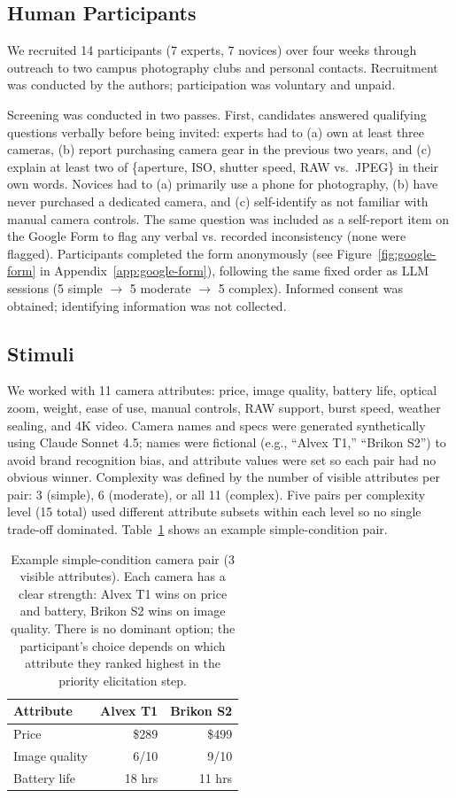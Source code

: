 \documentclass[manuscript,review]{acmart}
\begin{document}
\subsection{Human Participants}
We recruited 14 participants (7 experts, 7 novices) over four weeks through outreach to two campus photography clubs and personal contacts. Recruitment was conducted by the authors; participation was voluntary and unpaid.

Screening was conducted in two passes. First, candidates answered qualifying questions verbally before being invited: experts had to (a) own at least three cameras, (b) report purchasing camera gear in the previous two years, and (c) explain at least two of \{aperture, ISO, shutter speed, RAW vs.\ JPEG\} in their own words. Novices had to (a) primarily use a phone for photography, (b) have never purchased a dedicated camera, and (c) self-identify as not familiar with manual camera controls. The same question was included as a self-report item on the Google Form to flag any verbal vs. recorded inconsistency (none were flagged). Participants completed the form anonymously (see Figure~\ref{fig:google-form} in Appendix~\ref{app:google-form}), following the same fixed order as LLM sessions (5 simple $\rightarrow$ 5 moderate $\rightarrow$ 5 complex). Informed consent was obtained; identifying information was not collected.

\subsection{Stimuli}
We worked with 11 camera attributes: price, image quality, battery life, optical zoom, weight, ease of use, manual controls, RAW support, burst speed, weather sealing, and 4K video. Camera names and specs were generated synthetically using Claude Sonnet 4.5; names were fictional (e.g., ``Alvex T1,'' ``Brikon S2'') to avoid brand recognition bias, and attribute values were set so each pair had no obvious winner. Complexity was defined by the number of visible attributes per pair: 3 (simple), 6 (moderate), or all 11 (complex). Five pairs per complexity level (15 total) used different attribute subsets within each level so no single trade-off dominated. Table~\ref{tab:camera-pair} shows an example simple-condition pair.

\begin{table}[h]
  \caption{Example simple-condition camera pair (3 visible attributes). Each camera has a clear strength: Alvex T1 wins on price and battery, Brikon S2 wins on image quality. There is no dominant option; the participant's choice depends on which attribute they ranked highest in the priority elicitation step.}
  \label{tab:camera-pair}
  \centering
  \begin{tabular}{l r r}
    \toprule
    \textbf{Attribute} & \textbf{Alvex T1} & \textbf{Brikon S2} \\
    \midrule
    Price          & \$289   & \$499   \\
    Image quality  & 6/10    & 9/10    \\
    Battery life   & 18 hrs  & 11 hrs  \\
    \bottomrule
  \end{tabular}
\end{table}
\end{document}
